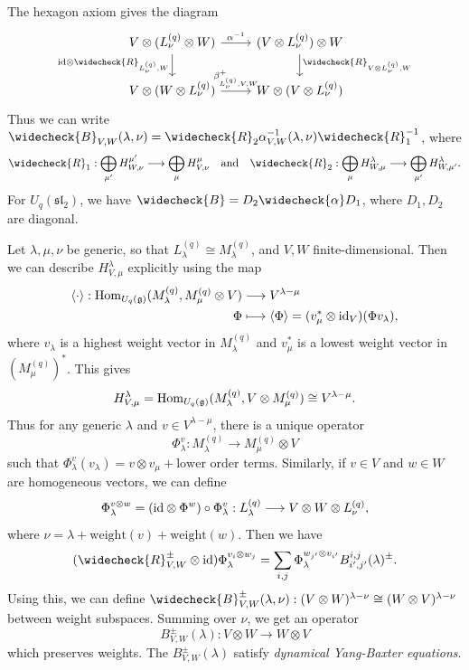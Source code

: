 \begin{remark}
  The hexagon axiom gives the diagram
  \[
    \begin{tikzcd}
      V \otimes (L^{(q)}_\nu \otimes W)
      \ar[r, "\alpha^{-1}"] \ar[d, "{\id} \otimes \widecheck{R}_{L^{(q)}_\nu, W}", swap]
       &
       (V \otimes L^{(q)}_\nu) \otimes W \ar[d, "\widecheck{R}_{V \otimes L^{(q)}_\nu, W}"] \\
      V \otimes (W \otimes L^{(q)}_\nu)
      \ar[r, "\beta^+_{L^{(q)}_\nu, V, W}"]
      & W \otimes (V \otimes L^{(q)}_\nu)
    \end{tikzcd}
  \]
  Thus we can write
  $\widecheck{B}_{V, W}(\lambda, \nu) = \widecheck{R}_2 \alpha_{V, W}^{-1}(\lambda, \nu) \widecheck{R}_1^{-1}$,
  where
  \[
    \widecheck{R}_1 : \bigoplus_{\mu'}
    H_{W, \nu}^{\mu'}
    \longrightarrow
    \bigoplus_\mu H^\mu_{V, \nu}
    \quad \text{and} \quad
    \widecheck{R}_2 : \bigoplus_\mu H^\lambda_{W, \mu}
    \longrightarrow
    \bigoplus_{\mu'} H_{W, \mu'}^{\lambda}.
  \]
  For $U_q(\mathfrak{sl}_2)$, we have
  $\widecheck{B} = D_2 \widecheck{\alpha} D_1$,
  where $D_1, D_2$ are diagonal.
\end{remark}

\begin{remark}
  Let $\lambda, \mu, \nu$ be generic, so
  that $L^{(q)}_\lambda \cong M^{(q)}_\lambda$,
  and $V, W$ finite-dimensional. Then
  we can describe
  $H^{\lambda}_{V, \mu}$ explicitly using
  the map
  \begin{align*}
    \langle \cdot \rangle
    : \operatorname{Hom}_{U_q(\mathfrak{g})}(M^{(q)}_\lambda, M^{(q)}_\mu \otimes V)
    &\longrightarrow V^{\lambda - \mu} \\
    \Phi
    &\longmapsto
    \langle \Phi \rangle
    = (v_\mu^* \otimes {\operatorname{id}_V})(\Phi v_\lambda),
  \end{align*}
  where $v_\lambda$ is a highest weight
  vector in $M^{(q)}_\lambda$ and
  $v_\mu^*$ is a lowest weight vector in
  $(M^{(q)}_\mu)^*$. This gives
  \[
    H^\lambda_{V, \mu}
    = \operatorname{Hom}_{U_q(\mathfrak{g})}(M^{(q)}_\lambda, V \otimes M^{(q)}_\mu)
    \cong V^{\lambda - \mu}.
  \]
  Thus for any generic $\lambda$
  and $v \in V^{\lambda - \mu}$, there
  is a unique operator
  \[
    \Phi^v_\lambda
    : M^{(q)}_\lambda
    \longrightarrow
    M^{(q)}_\mu \otimes V
  \]
  such that $\Phi^v_\lambda(v_\lambda) = v \otimes v_\mu + \text{lower order terms}$.
  Similarly, if $v \in V$ and $w \in W$
  are homogeneous vectors, we can define
  \[
    \Phi^{v \otimes w}_\lambda
    = ({\operatorname{id}} \otimes \Phi^w) \circ \Phi^v_\lambda
    : L^{(q)}_\lambda
    \longrightarrow
    V \otimes W \otimes L^{(q)}_\nu,
  \]
  where $\nu = \lambda + \mathrm{weight}(v) + \mathrm{weight}(w)$.
  Then we have
  \[
    (\widecheck{R}^{\pm}_{V, W} \otimes {\id})
    \Phi^{v_i \otimes w_j}_\lambda
    = \sum_{i, j}
    \Phi^{w_{j'} \otimes v_{i'}}_\lambda
    B^{i, j}_{i', j'}(\lambda)^{\pm}.
  \]
  Using this, we can define
  $\widecheck{B}^{\pm}_{V, W}(\lambda, \nu) : (V \otimes W)^{\lambda - \nu} \cong (W \otimes V)^{\lambda - \nu}$
  between weight subspaces.
  Summing over $\nu$, we get an operator
  \[
    B^{\pm}_{V, W}(\lambda)
    : V \otimes W \longrightarrow W \otimes V
  \]
  which preserves weights. The
  $B^{\pm}_{V, W}(\lambda)$ satisfy
  \emph{dynamical Yang-Baxter equations}.
\end{remark}
